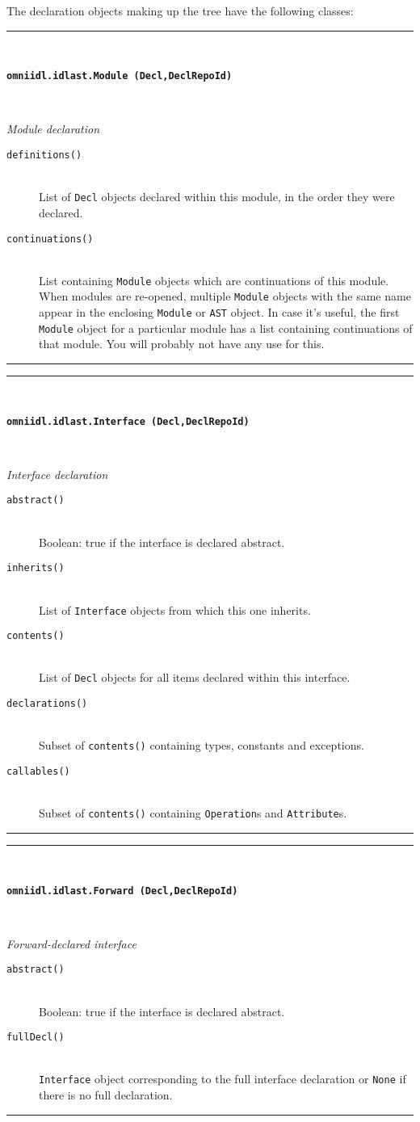 \documentclass[11pt,twoside,a4paper]{article}
\newcommand{\func}[1]{\texttt{#1}}
\newcommand{\var}[1]{\texttt{#1}}
\newcommand{\class}[1]{\texttt{#1}}
\newcommand{\dfunc}[1]{\item[\func{#1}]\mbox{}\\}
\newenvironment{classdesc}[2]%
  {\vspace{\baselineskip}%
   \noindent\begin{minipage}{\textwidth}%
   \noindent\rule{\textwidth}{1.5pt}\\%
   \centerline{\textbf{\texttt{#1}}}\\%
   \centerline{\textit{#2}}%
   \vspace{-.5\baselineskip}%
   \begin{description}}
  {\vspace{-\baselineskip}\end{description}%
   \noindent\rule{\textwidth}{1.5pt}\end{minipage}}
\begin{document}
The declaration objects making up the tree have the following classes:

\begin{classdesc}
  {omniidl.idlast.Module (Decl,DeclRepoId)}
  {Module declaration}

\dfunc{definitions()}
  List of \class{Decl} objects declared within this module, in the
  order they were declared.

\dfunc{continuations()}
  List containing \class{Module} objects which are continuations of
  this module.  When modules are re-opened, multiple \class{Module}
  objects with the same name appear in the enclosing \class{Module} or
  \class{AST} object. In case it's useful, the first \class{Module}
  object for a particular module has a list containing continuations
  of that module. You will probably not have any use for this.

\end{classdesc}


\begin{classdesc}
  {omniidl.idlast.Interface (Decl,DeclRepoId)}
  {Interface declaration}

\dfunc{abstract()}
  Boolean: true if the interface is declared abstract.

\dfunc{inherits()}
  List of \class{Interface} objects from which this one inherits.

\dfunc{contents()}
  List of \class{Decl} objects for all items declared within this
  interface.

\dfunc{declarations()}
  Subset of \func{contents()} containing types, constants and
  exceptions.

\dfunc{callables()}
  Subset of \func{contents()} containing \class{Operation}s and
  \class{Attribute}s.

\end{classdesc}


\begin{classdesc}
  {omniidl.idlast.Forward (Decl,DeclRepoId)}
  {Forward-declared interface}

\dfunc{abstract()}
  Boolean: true if the interface is declared abstract.

\dfunc{fullDecl()}
  \class{Interface} object corresponding to the full interface
  declaration or \var{None} if there is no full declaration.

\end{classdesc}
\end{document}
